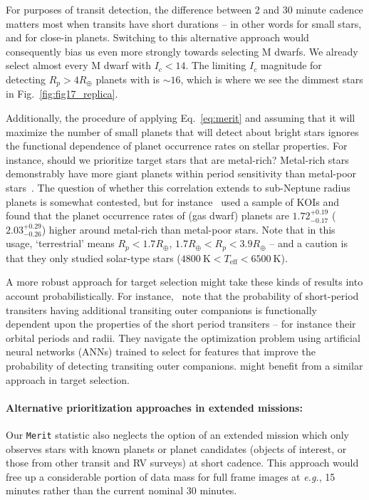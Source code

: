 For purposes of transit detection, the difference between 2 and 30
minute cadence matters most when transits have short durations -- in
other words for small stars, and for close-in planets.  Switching to
this alternative approach would consequently bias us even more
strongly towards selecting M dwarfs.  We already select almost every M
dwarf with $I_c < 14$.  The limiting $I_c$ magnitude for detecting
$R_p > 4R_\oplus$ planets with \tess is $\sim 16$, which is where we
see the dimmest stars in Fig.~\ref{fig:fig17_replica}.

Additionally, the procedure of applying Eq.~\ref{eq:merit} and
assuming that it will maximize the number of small planets that \tess
will detect about bright stars ignores the functional dependence of
planet occurrence rates on stellar properties.  For instance, should
we prioritize target stars that are metal-rich?  Metal-rich stars
demonstrably have more giant planets within \tesss period sensitivity
than metal-poor
stars~\citep{fischer_planet-metallicity_2005,johnson_giant_2010}.  The
question of whether this correlation extends to sub-Neptune radius
planets is somewhat contested, but for
instance~\citet{wang_revealing_2015} used a sample of KOIs and found
that the planet occurrence rates of (gas dwarf) planets are
$1.72^{+0.19}_{-0.17}$ ($2.03^{+0.29}_{-0.26}$) higher around
metal-rich than metal-poor stars.  Note that in this usage,
`terrestrial' means $R_p<1.7R_\oplus$, $1.7R_\oplus < R_p <
3.9R_\oplus$ -- and a caution is that they only studied solar-type
stars ($4800\ \mathrm{K}<T_\mathrm{eff}<6500\ \mathrm{K}$).

A more robust approach for \tesss target selection might take these
kinds of results into account probabilistically.  For
instance,~\protect\citet{kipping_transit_2016} note that the
probability of short-period transiters having additional transiting
outer companions is functionally dependent upon the properties of the
short period transiters -- for instance their orbital periods and
radii.  They navigate the optimization problem using artificial neural
networks (ANNs) trained to select for features that improve the
probability of detecting transiting outer companions.  \tess might
benefit from a similar approach in target selection.

\paragraph{Alternative prioritization approaches in extended missions:}
Our \texttt{Merit} statistic also neglects the option of an extended
mission which only observes stars with known planets or planet
candidates (\tesss objects of interest, or those from other transit
and RV surveys) at short cadence.  This approach would free up a
considerable portion of \tesss data mass for full frame images at
\textit{e.g.}, 15 minutes rather than the current nominal 30 minutes.

